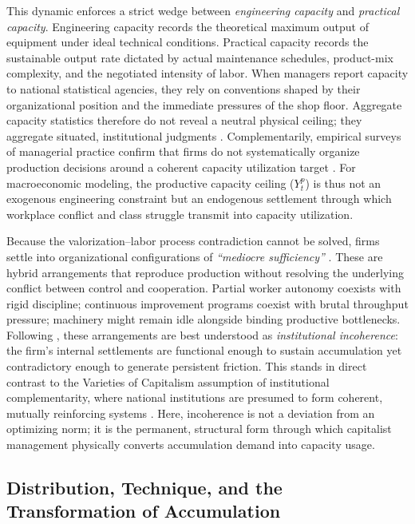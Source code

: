 This dynamic enforces a strict wedge between
\textit{engineering capacity} and \textit{practical capacity}.
Engineering capacity records the theoretical maximum output of
equipment under ideal technical conditions. Practical capacity
records the sustainable output rate dictated by actual
maintenance schedules, product-mix complexity, and the negotiated
intensity of labor. When managers report capacity to national
statistical agencies, they rely on conventions shaped by their
organizational position and the immediate pressures of the shop
floor. Aggregate capacity statistics therefore do not reveal a
neutral physical ceiling; they aggregate situated, institutional
judgments \citep{Shaikh2016, Nikiforos2016}. Complementarily,
empirical surveys of managerial practice confirm that firms do
not systematically organize production decisions around a
coherent capacity utilization target \citep{Singh2022}. For
macroeconomic modeling, the productive capacity ceiling ($Y^p_t$)
is thus not an exogenous engineering constraint but an endogenous
settlement through which workplace conflict and class struggle
transmit into capacity utilization.

Because the valorization--labor process contradiction cannot be
solved, firms settle into organizational configurations of
\textit{``mediocre sufficiency''} \citep{Vidal2022}. These are hybrid
arrangements that reproduce production without resolving the
underlying conflict between control and cooperation. Partial
worker autonomy coexists with rigid discipline; continuous
improvement programs coexist with brutal throughput pressure;
machinery might remain idle alongside binding productive bottlenecks. Following
\citet{Vidal2014}, these arrangements are best understood as
\textit{institutional incoherence}: the firm's internal
settlements are functional enough to sustain accumulation yet
contradictory enough to generate persistent friction. This stands
in direct contrast to the Varieties of Capitalism assumption of
institutional complementarity, where national institutions are
presumed to form coherent, mutually reinforcing systems \citep{Hall2003}. Here,
incoherence is not a deviation from an optimizing norm; it is the
permanent, structural form through which capitalist management
physically converts accumulation demand into capacity usage. 

\subsection{Distribution, Technique, and the Transformation
	of Accumulation}

